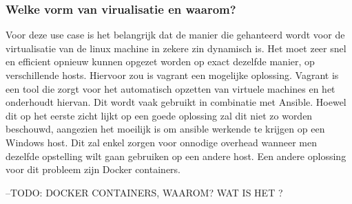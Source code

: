 \subsubsection{Welke vorm van virualisatie en waarom?}
Voor deze use case is het belangrijk dat de manier die gehanteerd wordt voor de virtualisatie van de linux machine in zekere zin dynamisch is. Het moet zeer snel en efficient opnieuw kunnen opgezet worden op exact dezelfde manier, op verschillende hosts. Hiervoor zou is vagrant een mogelijke oplossing. Vagrant is een tool die zorgt voor het automatisch opzetten van virtuele machines en het onderhoudt hiervan. \autocite{samandal2021} Dit wordt vaak gebruikt in combinatie met Ansible. Hoewel dit op het eerste zicht lijkt op een goede oplossing zal dit niet zo worden beschouwd, aangezien het moeilijk is om ansible werkende te krijgen op een Windows host. Dit zal enkel zorgen voor onnodige overhead wanneer men dezelfde opstelling wilt gaan gebruiken op een andere host. Een andere oplossing voor dit probleem zijn Docker containers. 



--TODO: DOCKER CONTAINERS, WAAROM? WAT IS HET ? 




